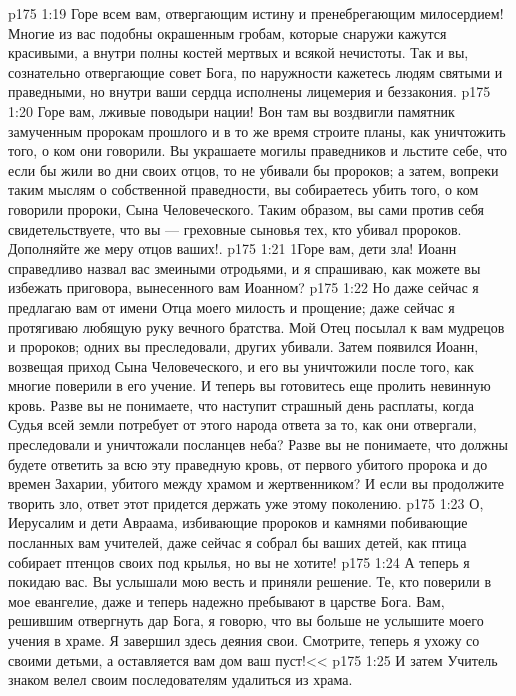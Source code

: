 \vs p175 1:19 Горе всем вам, отвергающим истину и пренебрегающим милосердием! Многие из вас подобны окрашенным гробам, которые снаружи кажутся красивыми, а внутри полны костей мертвых и всякой нечистоты. Так и вы, сознательно отвергающие совет Бога, по наружности кажетесь людям святыми и праведными, но внутри ваши сердца исполнены лицемерия и беззакония.
\vs p175 1:20 Горе вам, лживые поводыри нации! Вон там вы воздвигли памятник замученным пророкам прошлого и в то же время строите планы, как уничтожить того, о ком они говорили. Вы украшаете могилы праведников и льстите себе, что если бы жили во дни своих отцов, то не убивали бы пророков; а затем, вопреки таким мыслям о собственной праведности, вы собираетесь убить того, о ком говорили пророки, Сына Человеческого. Таким образом, вы сами против себя свидетельствуете, что вы --- греховные сыновья тех, кто убивал пророков. Дополняйте же меру отцов ваших!.
\vs p175 1:21 1Горе вам, дети зла! Иоанн справедливо назвал вас змеиными отродьями, и я спрашиваю, как можете вы избежать приговора, вынесенного вам Иоанном?
\vs p175 1:22 Но даже сейчас я предлагаю вам от имени Отца моего милость и прощение; даже сейчас я протягиваю любящую руку вечного братства. Мой Отец посылал к вам мудрецов и пророков; одних вы преследовали, других убивали. Затем появился Иоанн, возвещая приход Сына Человеческого, и его вы уничтожили после того, как многие поверили в его учение. И теперь вы готовитесь еще пролить невинную кровь. Разве вы не понимаете, что наступит страшный день расплаты, когда Судья всей земли потребует от этого народа ответа за то, как они отвергали, преследовали и уничтожали посланцев неба? Разве вы не понимаете, что должны будете ответить за всю эту праведную кровь, от первого убитого пророка и до времен Захарии, убитого между храмом и жертвенником? И если вы продолжите творить зло, ответ этот придется держать уже этому поколению.
\vs p175 1:23 О, Иерусалим и дети Авраама, избивающие пророков и камнями побивающие посланных вам учителей, даже сейчас я собрал бы ваших детей, как птица собирает птенцов своих под крылья, но вы не хотите!
\vs p175 1:24 А теперь я покидаю вас. Вы услышали мою весть и приняли решение. Те, кто поверили в мое евангелие, даже и теперь надежно пребывают в царстве Бога. Вам, решившим отвергнуть дар Бога, я говорю, что вы больше не услышите моего учения в храме. Я завершил здесь деяния свои. Смотрите, теперь я ухожу со своими детьми, а оставляется вам дом ваш пуст!<<
\vs p175 1:25 И затем Учитель знаком велел своим последователям удалиться из храма.
